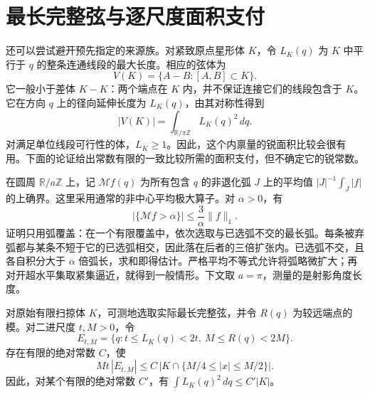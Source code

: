 \section{最长完整弦与逐尺度面积支付}\label{sec:chords}
还可以尝试避开预先指定的来源族。对紧致原点星形体 $K$，令 $L_K(q)$ 为 $K$ 中平行于 $q$ 的整条连通线段的最大长度。相应的弦体为
\[
 V(K)=\{A-B:[A,B]\subset K\}.
\]
它一般小于差体 $K-K$：两个端点在 $K$ 内，并不保证连接它们的线段包含于 $K$。它在方向 $q$ 上的径向延伸长度为 $L_K(q)$，由其对称性得到
\[
 |V(K)|=\int_{\mathbb{R}/\pi\mathbb{Z}}L_K(q)^2\,dq.
\]
对满足单位线段可行性的体，$L_K\ge1$。因此，这个内禀量的锐面积比较会很有用。下面的论证给出常数有限的一致比较所需的面积支付，但不确定它的锐常数。

在圆周 $\mathbb R/a\mathbb Z$ 上，记 $\mathcal M f(q)$ 为所有包含 $q$ 的非退化弧 $J$ 上的平均值 $|J|^{-1}\int_J|f|$ 的上确界。这里采用通常的非中心平均极大算子。对 $\alpha>0$，有
\begin{equation}\label{eq:circle-maximal-weak}
 |\{\mathcal M f>\alpha\}|\le\frac3\alpha\|f\|_1.
\end{equation}
证明只用弧覆盖：在一个有限覆盖中，依次选取与已选弧不交的最长弧。每条被弃弧都与某条不短于它的已选弧相交，因此落在后者的三倍扩张内。已选弧不交，且各自积分大于 $\alpha$ 倍弧长，求和即得估计。严格平均不等式允许将弧略微扩大；再对开超水平集取紧集逼近，就得到一般情形。下文取 $a=\pi$，测量的是射影角度长度。

\begin{proposition}[弦长与半径的联合支付]\label{prop:joint-shell}
对原始有限扫掠体 $K$，可测地选取实际最长完整弦，并令 $R(q)$ 为较远端点的模。对二进尺度 $t,M>0$，令
\[
 E_{t,M}=\{q:t\le L_K(q)<2t,\ M\le R(q)<2M\}.
\]
存在有限的绝对常数 $C$，使
\begin{equation}\label{eq:joint-shell}
 Mt\,|E_{t,M}|\le C\,|K\cap\{M/4\le|x|\le M/2\}|.
\end{equation}
因此，对某个有限的绝对常数 $C'$，有 $\int L_K(q)^2\,dq\le C'|K|$。
\end{proposition}

